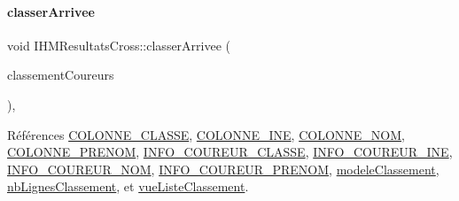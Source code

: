 \mbox{\label{class_i_h_m_resultats_cross_a5f4a74c4c024aaa9d39050ac176c9e37}} 
\paragraph{\texorpdfstring{classer\+Arrivee}{classerArrivee}\hspace{0.1cm}{\footnotesize\ttfamily [2/2]}}
{\footnotesize\ttfamily void I\+H\+M\+Resultats\+Cross\+::classer\+Arrivee (\begin{DoxyParamCaption}\item[{Q\+String\+List}]{classement\+Coureurs }\end{DoxyParamCaption})\hspace{0.3cm}{\ttfamily [private]}, {\ttfamily [slot]}}



Références \hyperlink{ihmchronocross_8h_a114680edc01528f77bb689b0a2ca18a2}{C\+O\+L\+O\+N\+N\+E\+\_\+\+C\+L\+A\+S\+SE}, \hyperlink{ihmgestioncross_8h_aa8208c9f9fd2ea2418e4b7bb28175f80}{C\+O\+L\+O\+N\+N\+E\+\_\+\+I\+NE}, \hyperlink{ihmchronocross_8h_aeee76385895c145ef5a633e6c6812603}{C\+O\+L\+O\+N\+N\+E\+\_\+\+N\+OM}, \hyperlink{ihmchronocross_8h_a5d6f240d26209cd66db8aa5e1aac62f9}{C\+O\+L\+O\+N\+N\+E\+\_\+\+P\+R\+E\+N\+OM}, \hyperlink{ihmchronocross_8h_a104dfa4cfc656a690caaec36fd4d3e2d}{I\+N\+F\+O\+\_\+\+C\+O\+U\+R\+E\+U\+R\+\_\+\+C\+L\+A\+S\+SE}, \hyperlink{ihmgestioncross_8h_a2e5435ad2b0c61674b2dad6c0ea46301}{I\+N\+F\+O\+\_\+\+C\+O\+U\+R\+E\+U\+R\+\_\+\+I\+NE}, \hyperlink{ihmchronocross_8h_a71b99ea06ae916bcd158edbd441c8c24}{I\+N\+F\+O\+\_\+\+C\+O\+U\+R\+E\+U\+R\+\_\+\+N\+OM}, \hyperlink{ihmchronocross_8h_a68fd2611ad0ef66da1a71726675067e7}{I\+N\+F\+O\+\_\+\+C\+O\+U\+R\+E\+U\+R\+\_\+\+P\+R\+E\+N\+OM}, \hyperlink{class_i_h_m_resultats_cross_a9d4e02948f64b6d9fef422d7f5a2b9b5}{modele\+Classement}, \hyperlink{class_i_h_m_resultats_cross_a696f826387c8fa8b9925ca468a52482e}{nb\+Lignes\+Classement}, et \hyperlink{class_i_h_m_resultats_cross_a8f35fc63f8c3a1351658d3148daf13e0}{vue\+Liste\+Classement}.


